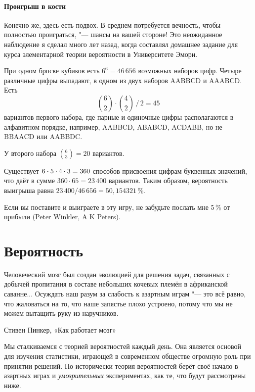 \documentclass[twoside]{book}
\begin{document}
\subsubsection*{Проигрыш в кости}%

Конечно же, здесь есть подвох.
В среднем потребуется вечность, чтобы полностью проиграться, "--- шансы на вашей стороне! 
Это неожиданное наблюдение я сделал много лет назад, когда составлял домашнее задание для курса элементарной теории вероятности в Университете Эмори.

При одном броске кубиков есть $6^6 =46\,656$ возможных наборов цифр.
Четыре различные цифры выпадают, в одном из двух наборов AABBCD и AAABCD.
Есть
\[\binom62\cdot\binom42\,\big/\,2=45\]
вариантов первого набора, где парные и одиночные цифры располагаются в алфавитном порядке, например, AABBCD, ABABCD, ACDABB, но не BBAACD или AABBDC.

У второго набора $\binom63=20$  вариантов.

Существует $6\cdot 5\cdot 4\cdot 3\z=360$ способов присвоения цифрам буквенных значений, что даёт в сумме $360\cdot 65=23\,400$ вариантов.
Таким образом, вероятность выигрыша равна
$23\,400/46\,656 = 50{,}154321\,\%$.
\heart

Если вы поставите и выиграете в эту игру, не забудьте послать мне 5\,\% от прибыли 
(Peter Winkler,  A  K Peters).



\chapter{Вероятность}

\setlength{\epigraphwidth}{.8\textwidth}
\epigraph{Человеческий мозг был создан эволюцией для решения задач, связанных с добычей пропитания в составе небольших кочевых племён в африканской саванне...
  Осуждать наш разум за слабость к азартным играм "--- это всё равно, что жаловаться на то, что наше запястье плохо устроено, потому что мы не можем вытащить руку из наручников.%
}{Стивен Пинкер, «Как работает мозг»%
}

Мы сталкиваемся с теорией вероятностей каждый день.
Она является основой для изучения статистики, играющей в современном обществе огромную роль при принятии решений.
Но исторически теория вероятностей берёт своё начало в азартных играх и \emph{умозрительных} экспериментах, как те, что будут рассмотрены ниже.
\end{document}
